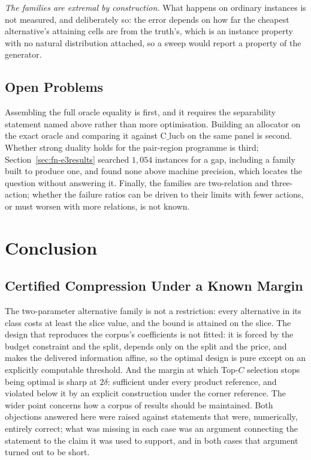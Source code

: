 \emph{The families are extremal by construction.} What happens on ordinary instances is not
measured, and deliberately so: the error depends on how far the cheapest alternative's
attaining cells are from the truth's, which is an instance property with no natural
distribution attached, so a sweep would report a property of the generator.

\subsection{Open Problems}

Assembling the full oracle equality is first, and it requires the separability statement named
above rather than more optimisation. Building an allocator on the exact oracle and comparing
it against $\mathrm{C\_lucb}$ on the same panel is second. Whether strong duality holds for
the pair-region programme is third; Section~\ref{sec:fn-e3results} searched $1{,}054$ instances
for a gap, including a family built to produce one, and found none above machine precision,
which locates the question without answering it. Finally, the families are two-relation and three-action;
whether the failure ratios can be driven to their limits with fewer actions, or must worsen
with more relations, is not known.


\section{Conclusion}

\subsection{Certified Compression Under a Known Margin}

The two-parameter alternative family is not a restriction: every alternative in its class
costs at least the slice value, and the bound is attained on the slice. The design
that reproduces the corpus's coefficients is not fitted: it is forced by the budget constraint
and the split, depends only on the split and the price, and makes the delivered information
affine, so the optimal design is pure except on an explicitly computable threshold. And the
margin at which Top-$C$ selection stops being optimal is sharp at $2\delta$: sufficient under
every product reference, and violated below it by an explicit construction under the corner
reference. The wider point concerns how a corpus of results should be maintained. Both
objections answered here were raised against statements that were, numerically, entirely
correct; what was missing in each case was an argument connecting the statement to the claim
it was used to support, and in both cases that argument turned out to be short.



